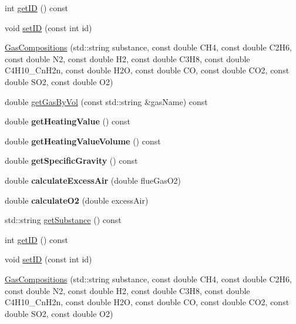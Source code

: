 \begin{DoxyCompactItemize}
\item 
int \hyperlink{class_gas_compositions_a9668decdb2b5065c8ee3c59c207b9d51}{get\+ID} () const
\item 
void \hyperlink{class_gas_compositions_a9fc3ebfcbda7134b67ed76a39b4c94cc}{set\+ID} (const int id)
\item 
\hyperlink{class_gas_compositions_ad0021d4285883374f8904f9465e41920}{Gas\+Compositions} (std\+::string substance, const double C\+H4, const double C2\+H6, const double N2, const double H2, const double C3\+H8, const double C4\+H10\+\_\+\+Cn\+H2n, const double H2O, const double CO, const double C\+O2, const double S\+O2, const double O2)
\item 
double \hyperlink{class_gas_compositions_a2028a42c136e057a6153b7bfa68d63e6}{get\+Gas\+By\+Vol} (const std\+::string \&gas\+Name) const
\item 
\mbox{\label{class_gas_compositions_a7ebcdf1c991bd70f28eb845e45d62afd}} 
double {\bfseries get\+Heating\+Value} () const
\item 
\mbox{\label{class_gas_compositions_a78803a5c2508df3fd679dca0eb378480}} 
double {\bfseries get\+Heating\+Value\+Volume} () const
\item 
\mbox{\label{class_gas_compositions_a4f891acb4f8dc3992703155c6ba7ccb0}} 
double {\bfseries get\+Specific\+Gravity} () const
\item 
\mbox{\label{class_gas_compositions_a4f6408254477960648440da460099e2d}} 
double {\bfseries calculate\+Excess\+Air} (double flue\+Gas\+O2)
\item 
\mbox{\label{class_gas_compositions_afc573b87fb7e7b99803b22470c402592}} 
double {\bfseries calculate\+O2} (double excess\+Air)
\item 
std\+::string \hyperlink{class_gas_compositions_abad9554bca9b68cd970eae11bdd3c505}{get\+Substance} () const
\item 
int \hyperlink{class_gas_compositions_a9668decdb2b5065c8ee3c59c207b9d51}{get\+ID} () const
\item 
void \hyperlink{class_gas_compositions_a9fc3ebfcbda7134b67ed76a39b4c94cc}{set\+ID} (const int id)
\item 
\hyperlink{class_gas_compositions_ad0021d4285883374f8904f9465e41920}{Gas\+Compositions} (std\+::string substance, const double C\+H4, const double C2\+H6, const double N2, const double H2, const double C3\+H8, const double C4\+H10\+\_\+\+Cn\+H2n, const double H2O, const double CO, const double C\+O2, const double S\+O2, const double O2)

\end{DoxyCompactItemize}
